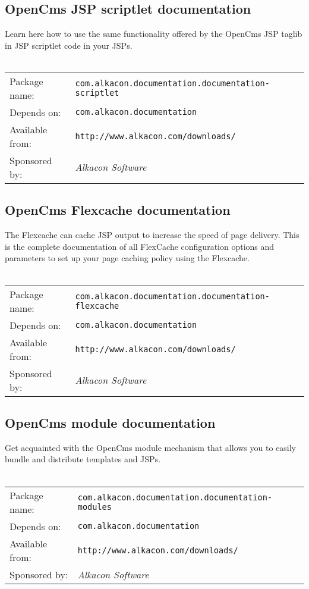 \subsection{OpenCms JSP scriptlet documentation}
Learn here how to use the same functionality offered by the OpenCms JSP taglib in JSP scriptlet 
code in your JSPs.
\\
\\
\begin{tabular}{ll}
Package name: & {\tt com.alkacon.documentation.documentation-scriptlet}\\
Depends on: & {\tt com.alkacon.documentation}\\
Available from: & {\tt http://www.alkacon.com/downloads/}\\
Sponsored by: & {\em Alkacon Software}\\
\end{tabular}

\subsection{OpenCms Flexcache documentation}
The Flexcache can cache JSP output to increase the speed of page delivery. This is the complete 
documentation of all FlexCache configuration options and parameters to set up your page caching 
policy using the Flexcache.
\\
\\
\begin{tabular}{ll}
Package name: & {\tt com.alkacon.documentation.documentation-flexcache}\\
Depends on: & {\tt com.alkacon.documentation}\\
Available from: & {\tt http://www.alkacon.com/downloads/}\\
Sponsored by: & {\em Alkacon Software}\\
\end{tabular}

\subsection{OpenCms module documentation}
Get acquainted with the OpenCms module mechanism that allows you to easily bundle and distribute 
templates and JSPs.
\\
\\
\begin{tabular}{ll}
Package name: & {\tt com.alkacon.documentation.documentation-modules}\\
Depends on: & {\tt com.alkacon.documentation}\\
Available from: & {\tt http://www.alkacon.com/downloads/}\\
Sponsored by: & {\em Alkacon Software}\\
\end{tabular}

